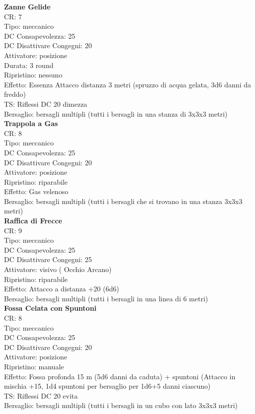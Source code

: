 \documentclass[a4paper,11pt,twoside,openany]{book}
\begin{document}
{\begin{multicols}{2}
\textbf{Zanne Gelide}\\
CR: 7 \\
Tipo: meccanico \\
DC Consapevolezza: 25 \\
DC Disattivare Congegni: 20 \\
Attivatore: posizione \\
Durata: 3 round \\
Ripristino: nessuno \\
Effetto: Essenza Attacco distanza 3 metri (spruzzo di acqua gelata, 3d6 danni da freddo) \\
TS: Riflessi DC 20 dimezza \\
Bersaglio: bersagli multipli (tutti i bersagli in una stanza di 3x3x3 metri)\\

\textbf{Trappola a Gas}\\
CR: 8 \\
Tipo: meccanico \\
DC Consapevolezza: 25 \\
DC Disattivare Congegni: 20 \\
Attivatore: posizione \\
Ripristino: riparabile \\
Effetto: Gas velenoso \\
Bersaglio: bersagli multipli (tutti i bersagli che si trovano in una stanza 3x3x3 metri)\\

\textbf{Raffica di Frecce}\\
CR: 9 \\
Tipo: meccanico \\
DC Consapevolezza: 25 \\
DC Disattivare Congegni: 25 \\
Attivatore: visivo ( Occhio Arcano) \\
Ripristino: riparabile \\
Effetto: Attacco a distanza +20 (6d6) \\
Bersaglio: bersagli multipli (tutti i bersagli in una linea di 6 metri)\\

\textbf{Fossa Celata con Spuntoni}\\
CR: 8 \\
Tipo: meccanico \\
DC Consapevolezza: 25 \\
DC Disattivare Congegni: 20 \\
Attivatore: posizione \\
Ripristino: manuale \\
Effetto: Fossa profonda 15 m (5d6 danni da caduta) + spuntoni (Attacco in mischia +15, 1d4 spuntoni per bersaglio per 1d6+5 danni ciascuno) \\
TS: Riflessi DC 20 evita \\
Bersaglio: bersagli multipli (tutti i bersagli in un cubo con lato 3x3x3 metri)\\


\end{multicols}}
\end{document}

